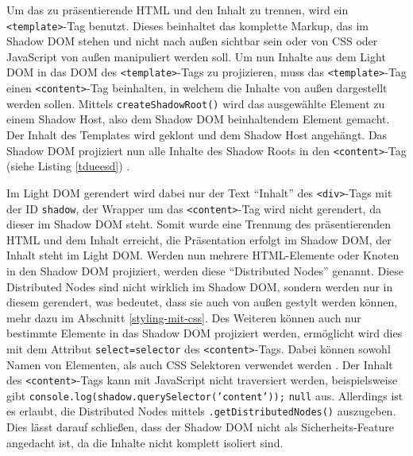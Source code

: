 Um das zu präsentierende \ac{HTML} und den Inhalt zu trennen, wird ein \texttt{\textless{}template\textgreater{}}-Tag benutzt. Dieses beinhaltet das komplette Markup, das im Shadow \ac{DOM} stehen und nicht nach außen sichtbar sein oder von \ac{CSS} oder JavaScript von außen manipuliert werden soll. Um nun Inhalte aus dem Light \ac{DOM} in das \ac{DOM} des \texttt{\textless{}template\textgreater{}}-Tags zu projizieren, muss das \texttt{\textless{}template\textgreater{}}-Tag einen \texttt{\textless{}content\textgreater{}}-Tag beinhalten, in welchem die Inhalte von außen dargestellt werden sollen. Mittels \texttt{createShadowRoot()} wird das ausgewählte Element zu einem Shadow Host, also dem Shadow \ac{DOM} beinhaltendem Element gemacht. Der Inhalt des Templates wird geklont und dem Shadow Host angehängt. Das Shadow \ac{DOM} projiziert nun alle Inhalte des Shadow Roots in den \texttt{\textless{}content\textgreater{}}-Tag (siehe Listing \ref{tdueesd}) \cite{citeulike:13851404}.



Im Light \ac{DOM} gerendert wird dabei nur der Text ``Inhalt'' des \texttt{\textless{}div\textgreater{}}-Tags mit der ID \texttt{shadow}, der Wrapper um das \texttt{\textless{}content\textgreater{}}-Tag wird nicht gerendert, da dieser im Shadow \ac{DOM} steht. Somit wurde eine Trennung des präsentierenden \ac{HTML} und dem Inhalt erreicht, die Präsentation erfolgt im Shadow \ac{DOM}, der Inhalt steht im Light \ac{DOM}. Werden nun mehrere \ac{HTML}-Elemente oder Knoten in den Shadow \ac{DOM} projiziert, werden diese ``Distributed Nodes'' genannt. Diese Distributed Nodes sind nicht wirklich im Shadow \ac{DOM}, sondern werden nur in diesem gerendert, was bedeutet, dass sie auch von außen gestylt werden können, mehr dazu im Abschnitt \ref{styling-mit-css}. Des Weiteren können auch nur bestimmte Elemente in das Shadow \ac{DOM} projiziert werden, ermöglicht wird dies mit dem Attribut \texttt{select=\dq selector\dq} des \texttt{\textless{}content\textgreater{}}-Tags. Dabei können sowohl Namen von Elementen, als auch \ac{CSS} Selektoren verwendet werden \cite{citeulike:13851402}. Der Inhalt des \texttt{\textless{}content\textgreater{}}-Tags kann mit JavaScript nicht traversiert werden, beispielsweise gibt \texttt{console.log(shadow.querySelector('content'));} \texttt{null} aus. Allerdings ist es erlaubt, die Distributed Nodes mittels \texttt{.getDistributedNodes()} auszugeben. Dies lässt darauf schließen, dass der Shadow \ac{DOM} nicht als Sicherheits-Feature angedacht ist, da die Inhalte nicht komplett isoliert sind.

